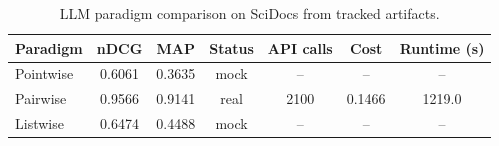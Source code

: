 \begin{table}[t]
\centering
\caption{LLM paradigm comparison on SciDocs from tracked artifacts.}
\label{tab:llm_paradigms}
\begin{tabular}{lcccccc}
\toprule
Paradigm & nDCG & MAP & Status & API calls & Cost & Runtime (s) \\
\midrule
Pointwise & 0.6061 & 0.3635 & mock & -- & -- & -- \\
Pairwise & 0.9566 & 0.9141 & real & 2100 & 0.1466 & 1219.0 \\
Listwise & 0.6474 & 0.4488 & mock & -- & -- & -- \\
\bottomrule
\end{tabular}
\end{table}
